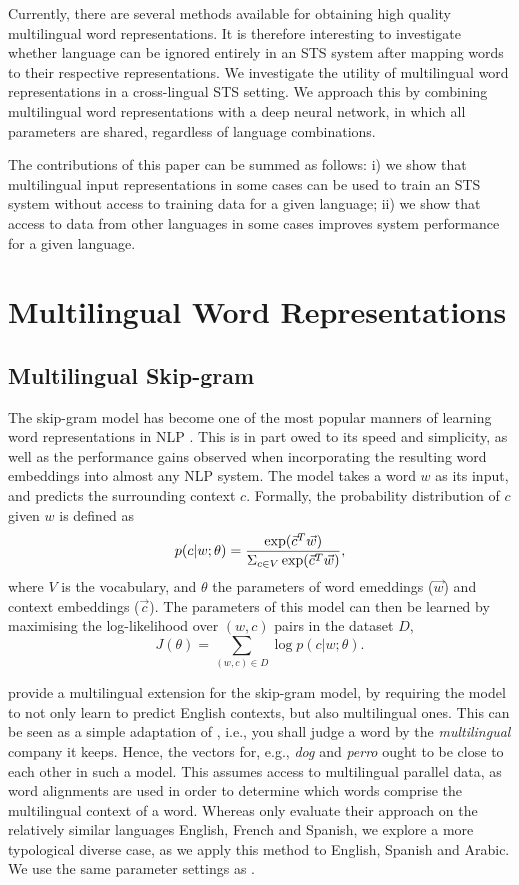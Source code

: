 \documentclass[11pt,a4paper]{article}
\begin{document}
Currently, there are several methods available for obtaining high quality multilingual word representations.
It is therefore interesting to investigate whether language can be ignored entirely in an STS system after mapping words to their respective representations.
We investigate the utility of multilingual word representations in a cross-lingual STS setting.
We approach this by combining multilingual word representations with a deep neural network, in which all parameters are shared, regardless of language combinations.

The contributions of this paper can be summed as follows:
i) we show that multilingual input representations in some cases can be used to train an STS system without access to training data for a given language;
ii) we show that access to data from other languages in some cases improves system performance for a given language.


\section{Multilingual Word Representations}

\subsection{Multilingual Skip-gram}
The skip-gram model has become one of the most popular manners of learning word representations in NLP \cite{mikolov:2013efficient}.
This is in part owed to its speed and simplicity, as well as the performance gains observed when incorporating the resulting word embeddings into almost any NLP system.
The model takes a word $w$ as its input, and predicts the surrounding context $c$.
Formally, the probability distribution of $c$ given $w$ is defined as
\begin{equation}
    p(c|w;\theta) = {\exp(\vec{c}^{T}\vec{w}) \over \Sigma_{c\in V} \exp(\vec{c}^{T}\vec{w})},
\end{equation}
where $V$ is the vocabulary, and $\theta$ the parameters of word emeddings ($\vec{w}$) and context embeddings ($\vec{c}$).
The parameters of this model can then be learned by maximising the log-likelihood over $(w,c)$ pairs in the dataset $D$,
\begin{equation}
    J(\theta) = \sum_{(w,c)\in D}\log p(c|w;\theta).
\end{equation}

 provide a multilingual extension for the skip-gram model, by requiring the model to not only learn to predict English contexts, but also multilingual ones.
This can be seen as a simple adaptation of , i.e., you shall judge a word by the \textit{multilingual} company it keeps.
Hence, the vectors for, e.g., \textit{dog} and \textit{perro} ought to be close to each other in such a model.
This assumes access to multilingual parallel data, as word alignments are used in order to determine which words comprise the multilingual context of a word.
Whereas  only evaluate their approach on the relatively similar languages English, French and Spanish, we explore a more typological diverse case, as we apply this method to English, Spanish and Arabic.
We use the same parameter settings as .
\end{document}
